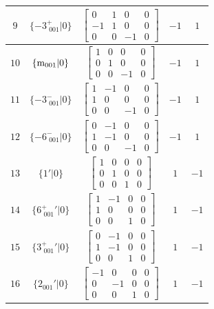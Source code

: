 \documentclass[fleqn,8pt]{jsarticle}
\begin{document}
\begin{longtable}{ccccc}
$ 9 $ & $ \{-3^{+}_{\,\,001}|0\} $ & $ \begin{bmatrix} 0 & 1 & 0 & 0 \\ -1 & 1 & 0 & 0 \\ 0 & 0 & -1 & 0 \end{bmatrix} $ & $ -1 $ & $ 1 $ \\ \hline
$ 10 $ & $ \{{\rm m}_{001}|0\} $ & $ \begin{bmatrix} 1 & 0 & 0 & 0 \\ 0 & 1 & 0 & 0 \\ 0 & 0 & -1 & 0 \end{bmatrix} $ & $ -1 $ & $ 1 $ \\ \hline
$ 11 $ & $ \{-3^{-}_{\,\,001}|0\} $ & $ \begin{bmatrix} 1 & -1 & 0 & 0 \\ 1 & 0 & 0 & 0 \\ 0 & 0 & -1 & 0 \end{bmatrix} $ & $ -1 $ & $ 1 $ \\ \hline
$ 12 $ & $ \{-6^{-}_{\,\,001}|0\} $ & $ \begin{bmatrix} 0 & -1 & 0 & 0 \\ 1 & -1 & 0 & 0 \\ 0 & 0 & -1 & 0 \end{bmatrix} $ & $ -1 $ & $ 1 $ \\ \hline
$ 13 $ & $ \{1{}'|0\} $ & $ \begin{bmatrix} 1 & 0 & 0 & 0 \\ 0 & 1 & 0 & 0 \\ 0 & 0 & 1 & 0 \end{bmatrix} $ & $ 1 $ & $ -1 $ \\ \hline
$ 14 $ & $ \{6^{+}_{\,\,001}{}'|0\} $ & $ \begin{bmatrix} 1 & -1 & 0 & 0 \\ 1 & 0 & 0 & 0 \\ 0 & 0 & 1 & 0 \end{bmatrix} $ & $ 1 $ & $ -1 $ \\ \hline
$ 15 $ & $ \{3^{+}_{\,\,001}{}'|0\} $ & $ \begin{bmatrix} 0 & -1 & 0 & 0 \\ 1 & -1 & 0 & 0 \\ 0 & 0 & 1 & 0 \end{bmatrix} $ & $ 1 $ & $ -1 $ \\ \hline
$ 16 $ & $ \{2{}_{001}{}'|0\} $ & $ \begin{bmatrix} -1 & 0 & 0 & 0 \\ 0 & -1 & 0 & 0 \\ 0 & 0 & 1 & 0 \end{bmatrix} $ & $ 1 $ & $ -1 $ \\ \hline

\end{longtable}
\end{document}
